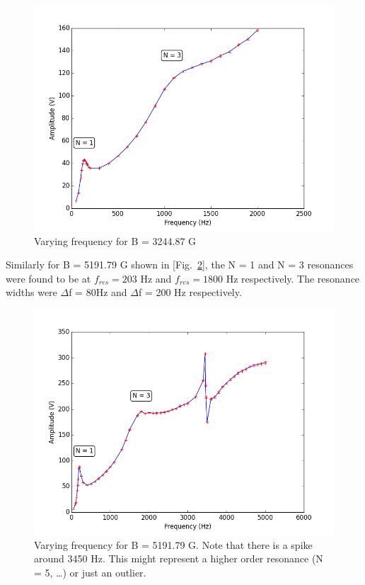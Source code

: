 \begin{figure}[H]
    \begin{center}
    \includegraphics[scale=0.46]{freq_10A_notitle.png}
    \caption{Varying frequency for B = 3244.87 G}
    \label{fig:freq_10A}
    \end{center}
\end{figure}

Similarly for B = 5191.79 G shown in [Fig.~\ref{fig:freq_16A}], the N = 1 and N = 3 resonances were found to be at $f_{res} = 203$ Hz and $f_{res} = 1800$ Hz respectively. The resonance widths were $\Delta$f = 80Hz and $\Delta$f = 200 Hz respectively.

\begin{figure}[H]
    \begin{center}
    \includegraphics[scale=0.46]{freq_16A_notitle.png}
    \caption{ Varying frequency for B = 5191.79 G. Note that there is a spike around 3450 Hz. This might represent a higher order resonance (N = 5, \ldots) or just an outlier.}
    \label{fig:freq_16A}
    \end{center}
\end{figure}

